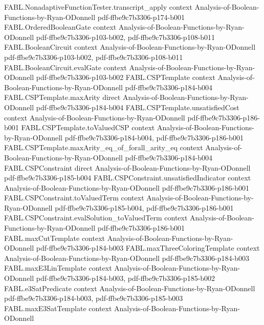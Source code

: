 \begin{theorem}
\proofstep
  {FABL.NonadaptiveFunctionTester.transcript_apply}
  {context}
  {Analysis-of-Boolean-Functions-by-Ryan-ODonnell}
  {pdf-ffbe9c7b3306-p174-b001}
\proofstep
  {FABL.OrderedBooleanGate}
  {context}
  {Analysis-of-Boolean-Functions-by-Ryan-ODonnell}
  {pdf-ffbe9c7b3306-p103-b002,
    pdf-ffbe9c7b3306-p108-b011}
\proofstep
  {FABL.BooleanCircuit}
  {context}
  {Analysis-of-Boolean-Functions-by-Ryan-ODonnell}
  {pdf-ffbe9c7b3306-p103-b002,
    pdf-ffbe9c7b3306-p108-b011}
\proofstep
  {FABL.BooleanCircuit.evalGate}
  {context}
  {Analysis-of-Boolean-Functions-by-Ryan-ODonnell}
  {pdf-ffbe9c7b3306-p103-b002}
\proofstep
  {FABL.CSPTemplate}
  {context}
  {Analysis-of-Boolean-Functions-by-Ryan-ODonnell}
  {pdf-ffbe9c7b3306-p184-b004}
\proofstep
  {FABL.CSPTemplate.maxArity}
  {direct}
  {Analysis-of-Boolean-Functions-by-Ryan-ODonnell}
  {pdf-ffbe9c7b3306-p184-b004}
\proofstep
  {FABL.CSPTemplate.unsatisfiedCost}
  {context}
  {Analysis-of-Boolean-Functions-by-Ryan-ODonnell}
  {pdf-ffbe9c7b3306-p186-b001}
\proofstep
  {FABL.CSPTemplate.toValuedCSP}
  {context}
  {Analysis-of-Boolean-Functions-by-Ryan-ODonnell}
  {pdf-ffbe9c7b3306-p184-b004,
    pdf-ffbe9c7b3306-p186-b001}
\proofstep
  {FABL.CSPTemplate.maxArity_eq_of_forall_arity_eq}
  {context}
  {Analysis-of-Boolean-Functions-by-Ryan-ODonnell}
  {pdf-ffbe9c7b3306-p184-b004}
\proofstep
  {FABL.CSPConstraint}
  {direct}
  {Analysis-of-Boolean-Functions-by-Ryan-ODonnell}
  {pdf-ffbe9c7b3306-p185-b004}
\proofstep
  {FABL.CSPConstraint.unsatisfiedIndicator}
  {context}
  {Analysis-of-Boolean-Functions-by-Ryan-ODonnell}
  {pdf-ffbe9c7b3306-p186-b001}
\proofstep
  {FABL.CSPConstraint.toValuedTerm}
  {context}
  {Analysis-of-Boolean-Functions-by-Ryan-ODonnell}
  {pdf-ffbe9c7b3306-p185-b004,
    pdf-ffbe9c7b3306-p186-b001}
\proofstep
  {FABL.CSPConstraint.evalSolution_toValuedTerm}
  {context}
  {Analysis-of-Boolean-Functions-by-Ryan-ODonnell}
  {pdf-ffbe9c7b3306-p186-b001}
\proofstep
  {FABL.maxCutTemplate}
  {context}
  {Analysis-of-Boolean-Functions-by-Ryan-ODonnell}
  {pdf-ffbe9c7b3306-p184-b003}
\proofstep
  {FABL.maxThreeColoringTemplate}
  {context}
  {Analysis-of-Boolean-Functions-by-Ryan-ODonnell}
  {pdf-ffbe9c7b3306-p184-b003}
\proofstep
  {FABL.maxE3LinTemplate}
  {context}
  {Analysis-of-Boolean-Functions-by-Ryan-ODonnell}
  {pdf-ffbe9c7b3306-p184-b003,
    pdf-ffbe9c7b3306-p185-b002}
\proofstep
  {FABL.e3SatPredicate}
  {context}
  {Analysis-of-Boolean-Functions-by-Ryan-ODonnell}
  {pdf-ffbe9c7b3306-p184-b003,
    pdf-ffbe9c7b3306-p185-b003}
\proofstep
  {FABL.maxE3SatTemplate}
  {context}
  {Analysis-of-Boolean-Functions-by-Ryan-ODonnell}

\end{theorem}
